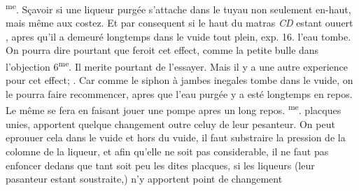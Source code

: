             \pend
\pstart
             \footnotesize{}\textsuperscript{me}. S\c{c}avoir si une liqueur purg\'{e}e\protect{} s'attache dans le tuyau non seulement en-haut, mais même aux costez. Et par consequent si le haut du matras \textit{CD} estant ouuert , apres qu'il  a demeur\'{e} longtemps dans le vuide tout plein, exp. 16. l'eau tombe. On pourra dire pourtant que  feroit cet effect, comme la petite bulle dans l'objection 6\textsuperscript{me}. Il merite pourtant de l'essayer. Mais il y a une autre experience pour cet effect; . Car comme le siphon \`{a} jambes inegales tombe dans le vuide\protect{}, on le pourra faire recommencer, apres que l'eau purg\'{e}e y a est\'{e} longtemps en repos. Le même se fera en faisant jouer une pompe\protect{} apres un long repos. \pend \pstart \footnotesize{}\textsuperscript{me}.  placques unies, apportent quelque changement outre celuy de leur pesanteur. On peut eprouuer cela dans le vuide et hors du vuide, il faut substraire la pression de la colomne de la liqueur\protect{}, et afin qu'elle ne soit pas considerable, il ne faut pas enfoncer dedans que tant soit peu les dites placques, si les liqueurs\protect{} (leur pasanteur estant soustraite,) n'y apportent point de changement